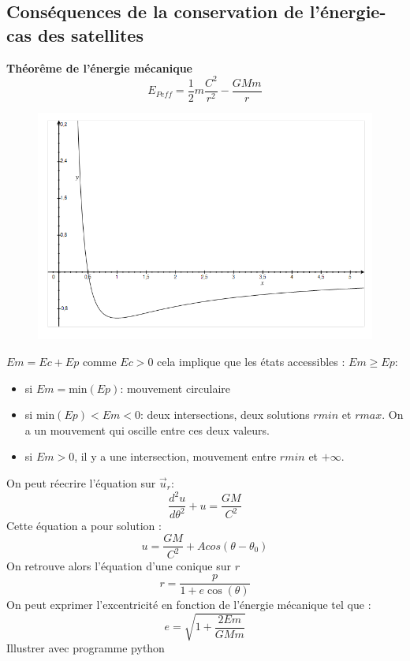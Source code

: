 \documentclass[10pt]{beamer}
\begin{document}
\subsection{Conséquences de la conservation de l'énergie-cas des satellites}
\begin{frame}{\insertsubsection}
    \textbf{Théorême de l'énergie mécanique}
    \begin{equation}
        E_{Peff} = \frac{1}{2}m\frac{C^2}{r^2}-\frac{GMm}{r}
    \end{equation}
    \begin{multicols}{2}
    \begin{figure}
        \centering
        \includegraphics[width=.5\textwidth]{Energiepotentielle_satellite.png}
    \end{figure}
    $Em=Ec+Ep$ comme $Ec>0$ cela implique que les états accessibles : $Em\geq Ep$:
    \begin{itemize}
        \item si $Em=\text{min}(Ep)$: mouvement circulaire
        \item si $\text{min}(Ep)<Em<0$: deux intersections, deux solutions $rmin$ et $rmax$. On a un mouvement qui oscille entre ces deux valeurs.
        \item si $Em>0$, il y a une intersection, mouvement entre $rmin$ et $+\infty$.
    \end{itemize}
    \end{multicols}
\end{frame}

\begin{frame}{\insertsubsection}
    On peut réecrire l'équation sur $\vec{u}_r$: 
    \[\dfrac{d^2u}{d\theta^2}+u=\dfrac{GM}{C^2}\]
    Cette équation a pour solution : 
    \[u = \dfrac{GM}{C^2}+Acos(\theta-\theta_0)\]
    On retrouve alors l'équation d'une conique sur $r$
    \[r=\dfrac{p}{1+e\cos(\theta)}\]
    On peut exprimer l'excentricité en fonction de l'énergie mécanique tel que : 
\begin{equation}
    e = \sqrt{1+\dfrac{2Em}{GMm}}
\end{equation}
Illustrer avec programme python
\end{frame}
\end{document}
